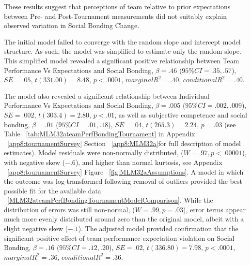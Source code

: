 \begin{CJK}{UTF8}{gbsn}
  These results suggest that perceptions of team relative to prior expectations between Pre- and Post-Tournament measurements did not suitably explain observed variation in Social Bonding Change.





  The initial model failed to converge with the random slope and intercept model structure.  As such, the model was simplified to estimate only the random slope. This simplified model revealed a significant positive relationship between Team Performance Vs Expectations and Social Bonding, $\beta = .46$ ($95\% CI =  .35, .57$), $SE = .05$, $t(331.00) = 8.48$, $p < .0001$, $marginal R^2 = .40$, $conditional R^2 = .40$.

  The model also revealed a significant relationship between Individual Performance Vs Expectations and Social Bonding, $\beta = .005$ ($95\% CI =  .002, .009$), $SE = .002$, $t(303.4) = 2.80$, $p < .01$, as well as subjective competence and social bonding, $\beta = .01$ ($95\% CI =  .01, .18$), $SE = .04$, $t(265.3) = 2.24$, $p = .03$ (see Table ~\ref{tab:MLM32ateamPerfBondingTournament} in Appendix ~\ref{app8:tournamentSurvey} Section ~\ref{app8:MLM32a}for full description of model estimates).  Model residuals were non-normally distributed, ($W = .97, p < .00001$), with negative skew ($-.6$), and higher than normal kurtosis, see Appendix ~\ref{app8:tournamentSurvey} Figure ~\ref{fig:MLM32aAssumptions}.  A model in which the outcome was log-transformed following removal of outliers provided the best possible fit for the available data ~\ref{MLM32ateamPerfBondingTournamentModelComparison}. While the distribution of errors was still non-normal, ($W = .99, p = .03$),  error terms appear much more evenly distributed around zero than the original model, albeit with a slight negative skew ($-.1$).
  The adjusted model provided confirmation that the significant positive effect of team performance expectation violation on Social Bonding,  $\beta = .16$ ($95\% CI =  .12, .20$), $SE = .02$, $t(336.80) = 7.98$, $p < .0001$, $marginal R^2 = .36$, $conditional R^2 = .36$.

   

   



\end{CJK}
